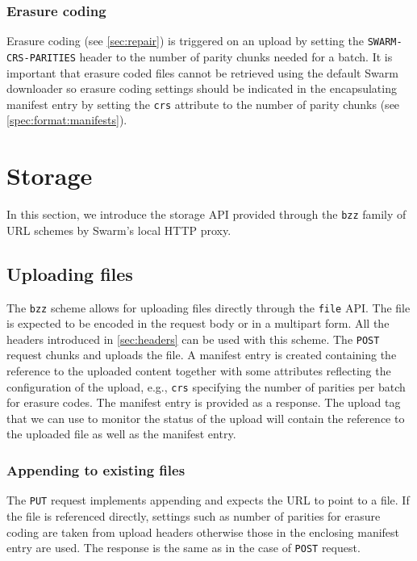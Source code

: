 \subsubsection{Erasure coding}

Erasure coding (see \ref{sec:repair}) is triggered on an upload by setting the \lstinline{SWARM-CRS-PARITIES} header to the number of parity chunks needed for a batch. It is important that erasure coded files cannot be retrieved using the default Swarm downloader so erasure coding settings should be indicated in the encapsulating manifest entry by setting the \lstinline{crs} attribute to the number of parity chunks (see \ref{spec:format:manifests}). 

\section{Storage \statusgreen}\label{sec:storage-ux}

\green{}


In this section, we introduce the storage API provided through the \lstinline{bzz} family of URL schemes by Swarm's local HTTP proxy.

\subsection{Uploading files \statusgreen}\label{sec:file-api}

The \lstinline{bzz} scheme allows for uploading files directly through the \lstinline{file} API. The file is expected to be encoded in the request body or in a multipart form. All the headers introduced in \ref{sec:headers} can be used with this scheme. The \lstinline{POST} request chunks and uploads the file. A manifest entry is created containing the reference to the uploaded content together with some attributes reflecting the configuration of the upload, e.g., \lstinline{crs} specifying the number of parities per batch for erasure codes.
The manifest entry is provided as a response. The upload tag that we can use to monitor the status of the upload will contain the reference to the uploaded file as well as the manifest entry.

\subsubsection{Appending to existing files}\label{sec:append}

The \lstinline{PUT} request implements appending and expects the URL to point to a file. If the file is referenced directly, settings such as number of parities for erasure coding are taken from upload headers otherwise those in the enclosing manifest entry are used. The response is the same as in the case of \lstinline{POST} request.


